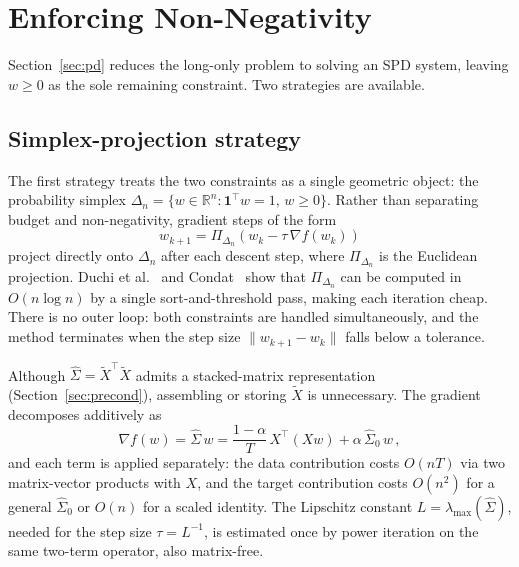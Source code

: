 \section{Enforcing Non-Negativity}\label{sec:primaldual}

Section~\ref{sec:pd} reduces the long-only problem to solving an SPD system, leaving
$w \geq 0$ as the sole remaining constraint. Two strategies are available.

\subsection{Simplex-projection strategy}
The first strategy treats the two constraints as a single geometric object: the
probability simplex
$\Delta_n = \{w \in \mathbb{R}^n : \mathbf{1}^\top w = 1,\, w \geq 0\}$.
Rather than separating budget and non-negativity, gradient steps of the form
\[
  w_{k+1} = \Pi_{\Delta_n}\!\left(w_k - \tau\,\nabla f(w_k)\right)
\]
project directly onto $\Delta_n$ after each descent step, where $\Pi_{\Delta_n}$
is the Euclidean projection.
Duchi et al.\ \cite{duchi2008} and Condat~\cite{condat2016} show that $\Pi_{\Delta_n}$ can be computed in
$O(n\log n)$ by a single sort-and-threshold pass, making each iteration cheap.
There is no outer loop: both constraints are handled simultaneously, and the method
terminates when the step size $\|w_{k+1} - w_k\|$ falls below a tolerance.

Although $\hat\Sigma = \tilde{X}^\top\tilde{X}$ admits a stacked-matrix
representation (Section~\ref{sec:precond}), assembling or storing $\tilde{X}$ is
unnecessary. The gradient decomposes additively as
\[
  \nabla f(w) = \hat\Sigma\,w
  = \frac{1-\alpha}{T}\,X^\top(Xw) + \alpha\,\hat\Sigma_0\,w\,,
\]
and each term is applied separately: the data contribution costs $O(nT)$ via two
matrix-vector products with $X$, and the target contribution costs $O(n^2)$ for a general
$\hat\Sigma_0$ or $O(n)$ for a scaled identity. The Lipschitz constant
$L = \lambda_{\max}(\hat\Sigma)$, needed for the step size $\tau = L^{-1}$,
is estimated once by power iteration on the same two-term operator, also matrix-free.


